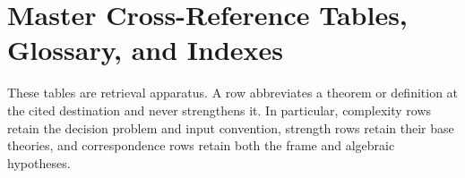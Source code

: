 \section*{Master Cross-Reference Tables, Glossary, and Indexes}
\label{sec:p14-master-tables}

These tables are retrieval apparatus. A row abbreviates a theorem or definition
at the cited destination and never strengthens it. In particular, complexity
rows retain the decision problem and input convention, strength rows retain
their base theories, and correspondence rows retain both the frame and
algebraic hypotheses.


